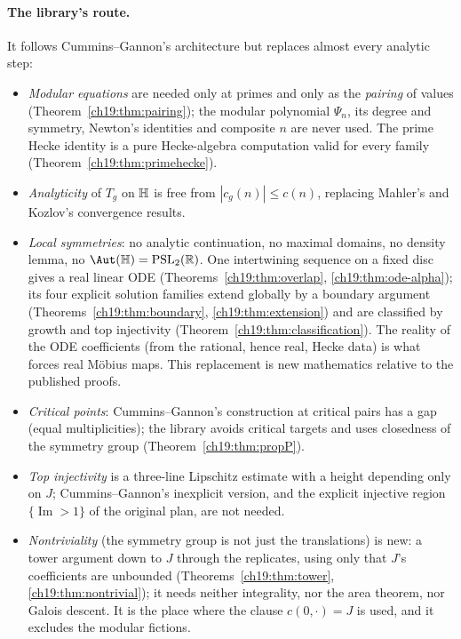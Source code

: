 \paragraph{The library's route.}  It follows Cummins--Gannon's architecture but replaces almost every
analytic step:
\begin{itemize}
\item \emph{Modular equations} are needed only at primes and only as the \emph{pairing} of values (Theorem~\ref{ch19:thm:pairing}); the modular
  polynomial $\Psi_n$, its degree and symmetry, Newton's identities and composite $n$ are never used.  The prime Hecke identity is a pure
  Hecke-algebra computation valid for every family (Theorem~\ref{ch19:thm:primehecke}).
\item \emph{Analyticity} of $T_g$ on $\mathbb{H}$ is free from $|c_g(n)|\le c(n)$, replacing Mahler's and Kozlov's convergence results.
\item \emph{Local symmetries}: no analytic continuation, no maximal domains, no density lemma, no $\Aut(\chnineteenH)=\mathrm{PSL}_2(\chnineteenR)$.  One
  intertwining sequence on a fixed disc gives a real linear ODE (Theorems~\ref{ch19:thm:overlap}, \ref{ch19:thm:ode-alpha}); its four explicit
  solution families extend globally by a boundary argument (Theorems~\ref{ch19:thm:boundary}, \ref{ch19:thm:extension}) and are classified by growth
  and top injectivity (Theorem~\ref{ch19:thm:classification}).  The reality of the ODE coefficients (from the rational, hence real, Hecke data) is
  what forces real M\"obius maps.  This replacement is new mathematics relative to the published proofs.
\item \emph{Critical points}: Cummins--Gannon's construction at critical pairs has a gap (equal multiplicities); the library avoids critical
  targets and uses closedness of the symmetry group (Theorem~\ref{ch19:thm:propP}).
\item \emph{Top injectivity} is a three-line Lipschitz estimate with a height depending only on $J$; Cummins--Gannon's inexplicit version, and the
  explicit injective region $\{\operatorname{Im}>1\}$ of the original plan, are not needed.
\item \emph{Nontriviality} (the symmetry group is not just the translations) is new: a tower argument down to $J$ through the replicates,
  using only that $J$'s coefficients are unbounded (Theorems~\ref{ch19:thm:tower}, \ref{ch19:thm:nontrivial}); it needs neither integrality,
  nor the area theorem, nor Galois descent.  It is the place where the clause $c(0,\cdot)=J$ is used, and it excludes the modular fictions.

\end{itemize}
